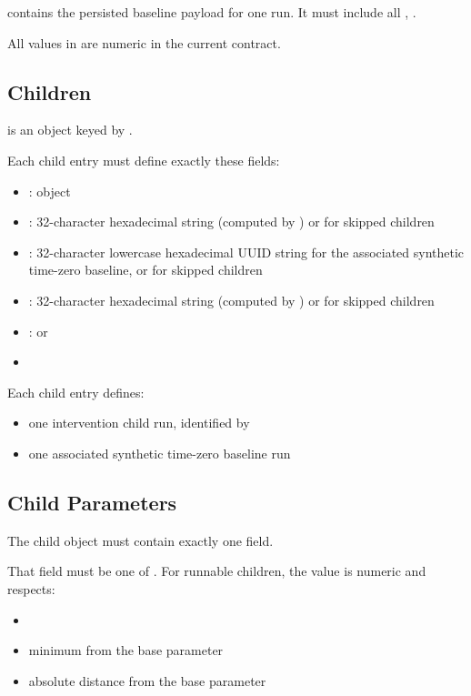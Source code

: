 \documentclass[11pt]{article}
\begin{document}
 contains the persisted baseline payload for one run. 
It must include all , .


All values in  are numeric in the current contract.
\subsection*{Children}

 is an object keyed by .

Each child entry must define exactly these fields:
\begin{itemize}
\item {}: object
\item {}: 32-character hexadecimal string (computed by ) or  for skipped children
\item {}: 32-character lowercase hexadecimal UUID string for the associated synthetic time-zero baseline, or  for skipped children
\item {}: 32-character hexadecimal string (computed by ) or  for skipped children
\item {}:  or 
\item {}
\end{itemize}

Each child entry defines:
\begin{itemize}
\item one intervention child run, identified by 
\item one associated synthetic time-zero baseline run
\end{itemize}

\subsection*{Child Parameters}

The child  object must contain exactly one field.

That field must be one of . For runnable children, the value is numeric and respects:
\begin{itemize}
  \item {} 
  \item {}\termMinSRDDistance minimum \termSRD from the base parameter
  \item {}\termMinAbsDist absolute distance from the base parameter
\end{itemize}
\end{document}
